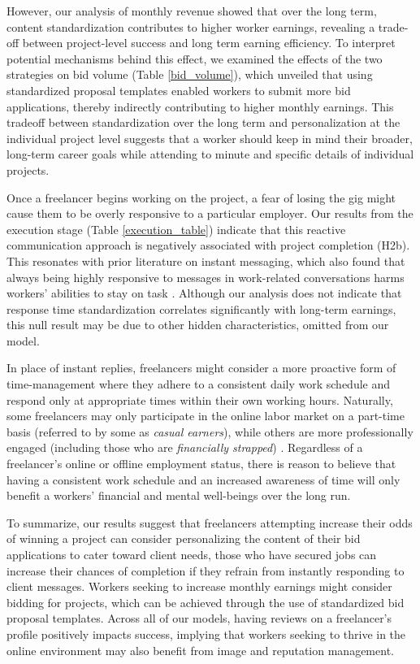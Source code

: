 However, our analysis of monthly revenue showed that over the long term, content standardization contributes to higher worker earnings, revealing a trade-off between project-level success and long term earning efficiency. To interpret potential mechanisms behind this effect, we examined the effects of the two strategies on bid volume (Table \ref{bid_volume}), which unveiled that using standardized proposal templates enabled workers to submit more bid applications, thereby indirectly contributing to higher monthly earnings. This tradeoff between standardization over the long term and personalization at the individual project level suggests that a worker should keep in mind their broader, long-term career goals while attending to minute and specific details {of individual} projects.


Once a freelancer begins working on the project, a fear of losing the gig might cause them to be overly responsive to a particular employer. 
Our results from the execution stage (Table \cref{execution_table}) indicate that this reactive communication approach is negatively associated with project completion {(H2b)}. 
This resonates with prior literature on instant messaging, which also found that always being highly responsive to messages in work-related conversations harms workers' abilities to stay on task \cite{Avrahami2004-cd}. Although our analysis does not indicate that response time standardization correlates significantly with long-term earnings, this null result may be due to other hidden characteristics, omitted from our model.

In place of instant replies, freelancers might consider a more proactive form of time-management where they adhere to a consistent daily work schedule and respond only at appropriate times within their own working hours. Naturally, some freelancers may only participate in the online labor market on a part-time basis (referred to by some as \textit{casual earners}), while others are more professionally engaged (including those who are \textit{financially strapped}) \cite{manyika2016independent}. Regardless of a freelancer's online or offline employment status, there is reason to believe that having a consistent work schedule and an increased awareness of time will only benefit a workers' financial and mental well-beings over the long run.


To summarize, our results suggest that freelancers attempting increase their odds of winning a project can consider personalizing the content of their bid applications to cater toward client needs, those who have secured jobs can increase their chances of completion {if they refrain from instantly responding to client messages. Workers seeking to increase monthly earnings might consider bidding for projects, which can be achieved through the use of standardized bid proposal templates.} Across all of our models, having reviews on a freelancer's profile positively impacts success, implying that workers seeking to thrive in the online environment may also benefit from image and reputation management.

